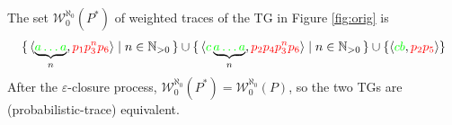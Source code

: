 \begin{example}
	The set $\mathcal{W}_0^{\aleph_0}(P^*)$ of weighted traces of the TG in Figure \ref{fig:orig} is
$$\set{\braket{\underbrace{\color{green}a\dots a}_{n},{\color{red}p_1p_3^np_6}}|n\in \mathbb{N}_{>0}}\cup \set{\braket{{\color{green}c}\underbrace{\color{green}a\dots a}_{n},{\color{red}p_2p_4p_3^np_6}}|n\in \mathbb{N}_{>0}}\cup\{\braket{{\color{green}cb},{\color{red}p_2p_5}}\}$$
After the $\varepsilon$-closure process, $\mathcal{W}_0^{\aleph_0}(P^*)=\mathcal{W}_0^{\aleph_0}(P)$, so the two TGs are (probabilistic-trace) equivalent.
\end{example}
